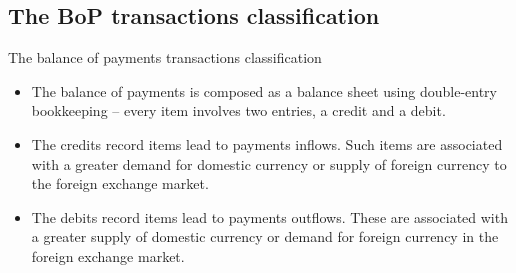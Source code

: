 \documentclass[international_finance_p1.tex]{subfiles}
\begin{document}
\subsection{The BoP transactions classification}
\begin{frame}{The balance of payments transactions classification}
\begin{itemize}[<+->]
\item
The balance of payments is composed as a balance sheet using double-entry bookkeeping – every item involves two entries, a credit and a debit. 
\item
The credits record items lead to payments inflows. Such items are associated with a greater demand for domestic currency or supply of foreign currency to the foreign exchange market. 
\item
The debits record items lead to payments outflows. These are associated with a greater supply of domestic currency or demand for foreign currency in the foreign exchange market.
\end{itemize}
\end{frame}
\end{document}
